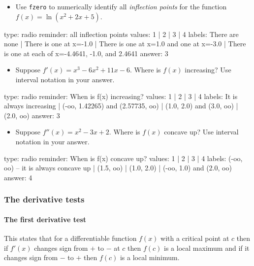 \documentclass[12pt]{article}
\begin{document}
\begin{itemize}
\itemsep1pt\parskip0pt
\item
  Use \texttt{fzero} to numerically identify all \emph{inflection
  points} for the function $f(x) = \ln(x^2 + 2x + 5)$.
\end{itemize}

\begin{answer}
type: radio
reminder: all inflection points
values: 1 | 2 | 3 | 4
labels: There are none | There is one at x=-1.0 | There is one at x=1.0 and one at x=-3.0 | There is one at each of x=-4.4641, -1.0, and 2.4641
answer: 3
\end{answer}

\begin{itemize}
\itemsep1pt\parskip0pt
\item
  Suppose $f'(x) = x^3 - 6x^2 + 11x - 6$. Where is $f(x)$ increasing?
  Use interval notation in your answer.
\end{itemize}

\begin{answer}
type: radio
reminder: When is f(x) increasing?
values: 1 | 2 | 3 | 4
labels: It is always increasing | (-oo, 1.42265) and (2.57735, oo) | (1.0, 2.0) and (3.0, oo) | (2.0, oo)
answer: 3
\end{answer}

\begin{itemize}
\itemsep1pt\parskip0pt
\item
  Suppose $f''(x) = x^2 - 3x + 2$. Where is $f(x)$ concave up? Use
  interval notation in your answer.
\end{itemize}

\begin{answer}
type: radio
reminder: When is f(x) concave up?
values: 1 | 2 | 3 | 4
labels: (-oo, oo) -- it is always concave up | (1.5, oo) | (1.0, 2.0) | (-oo, 1.0) and (2.0, oo)
answer: 4
\end{answer}

\subsubsection{The derivative tests}

\paragraph{The first derivative test}

This states that for a differentiable function $f(x)$ with a critical
point at $c$ then if $f'(x)$ changes sign from $+$ to $-$ at $c$ then
$f(c)$ is a local maximum and if it changes sign from $-$ to $+$ then
$f(c)$ is a local minimum.
\end{document}
